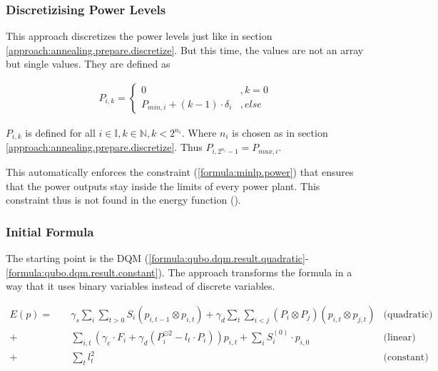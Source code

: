 \subsubsection{Discretizising Power Levels}

This approach discretizes the power levels just like in section \ref{approach:annealing.prepare.discretize}.
But this time, the values are not an array but single values.
They are defined as

\begin{align}
  P_{i, k} = \begin{cases}
    0 & , k = 0 \\
    P_{min, i} + (k - 1) \cdot \delta_i & , else
  \end{cases}
\end{align}

$P_{i, k}$ is defined for all $i \in \mathbb{I}, k \in \mathbb{N}, k < 2^{n_i}$.
Where $n_i$ is chosen as in section \ref{approach:annealing.prepare.discretize}.
Thus $P_{i, 2^{n_i} - 1} = P_{max, i}$.

This automatically enforces the constraint (\ref{formula:minlp.power}) that ensures that the power outputs stay inside the limits of every power plant.
This constraint thus is not found in the energy function ().

\subsubsection{Initial Formula}

The starting point is the DQM (\ref{formula:qubo.dqm.result.quadratic}-\ref{formula:qubo.dqm.result.constant}).
The approach transforms the formula in a way that it uses binary variables instead of discrete variables.

\begin{subequations}
\begin{align}
  E(p) = \quad
  &
  \gamma_s \sum_i \sum_{t > 0} S_i \left( p_{i, t-1} \otimes p_{i, t} \right)
  + \gamma_d \sum_t \sum_{i < j} \left( P_i \otimes P_j \right) \left( p_{i, t} \otimes p_{j, t} \right)
  & \text{(quadratic)}
  \label{formula:qubo.dqm.result.quadratic}
  \\ + \quad &
  \sum_{i, t} \left(
    \gamma_c \cdot F_i + \gamma_d \left(P_i^{\odot 2} - l_t \cdot P_i \right)
  \right) p_{i, t}
  + \sum_i S_i^{(0)} \cdot p_{i, 0}
  & \text{(linear)}
  \label{formula:qubo.dqm.result.linear}
  \\ + \quad &
  \sum_t l_t^2
  & \text{(constant)}
  \label{formula:qubo.dqm.result.constant}
\end{align}
\end{subequations}

